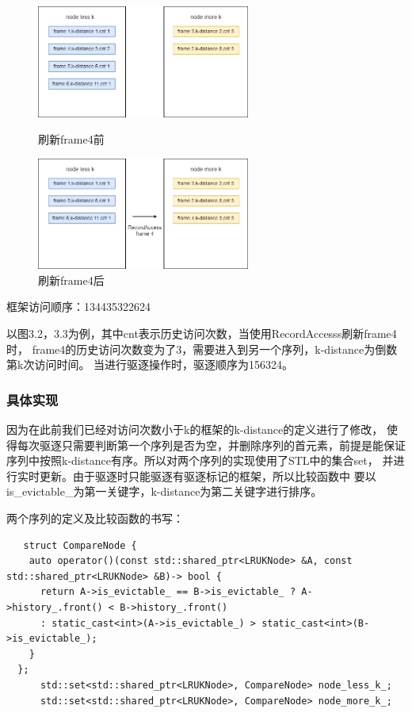 \documentclass[a4paper]{article}
\begin{document}
 \begin{figure}[htbp]
   \centering
   \begin{minipage}[t]{0.48\textwidth}
      \centering
      \includegraphics[width=7cm]{2.png}
      \caption{刷新frame4前}
   \end{minipage}
   \begin{minipage}[t]{0.48\textwidth}
      \centering
      \includegraphics[width=7cm]{3.png}
      \caption{刷新frame4后}
   \end{minipage}
\end{figure}

框架访问顺序：134435322624

以图3.2，3.3为例，其中cnt表示历史访问次数，当使用RecordAccesss刷新frame4时，
frame4的历史访问次数变为了3，需要进入到另一个序列，k-distance为倒数第k次访问时间。
当进行驱逐操作时，驱逐顺序为156324。

\subsubsection{具体实现}

因为在此前我们已经对访问次数小于k的框架的k-distance的定义进行了修改，
使得每次驱逐只需要判断第一个序列是否为空，并删除序列的首元素，前提是能保证
序列中按照k-distance有序。所以对两个序列的实现使用了STL中的集合set，
并进行实时更新。由于驱逐时只能驱逐有驱逐标记的框架，所以比较函数中
要以is\_evictable\_为第一关键字，k-distance为第二关键字进行排序。

两个序列的定义及比较函数的书写：
\begin{verbatim}
   struct CompareNode {
    auto operator()(const std::shared_ptr<LRUKNode> &A, const std::shared_ptr<LRUKNode> &B)-> bool {
      return A->is_evictable_ == B->is_evictable_ ? A->history_.front() < B->history_.front()
      : static_cast<int>(A->is_evictable_) > static_cast<int>(B->is_evictable_);
    }
  };
      std::set<std::shared_ptr<LRUKNode>, CompareNode> node_less_k_;
      std::set<std::shared_ptr<LRUKNode>, CompareNode> node_more_k_;
\end{verbatim}
\end{document}
